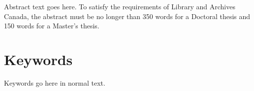 
Abstract text goes here.
To satisfy the requirements of Library and Archives Canada, the abstract must be no longer than 350 words for a Doctoral thesis and 150 words for a Master's thesis.

\section*{Keywords}

Keywords go here in normal text.